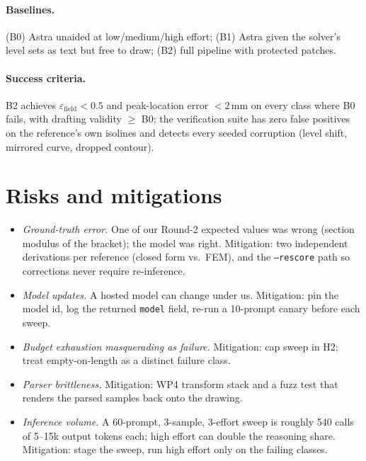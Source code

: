 \documentclass[11pt,a4paper]{article}
\newcommand{\eps}{\varepsilon_{\mathrm{field}}}
\begin{document}
\paragraph{Baselines.} (B0) Astra unaided at low/medium/high effort; (B1) Astra given the solver's level sets as text but free to draw; (B2) full pipeline with protected patches.
\paragraph{Success criteria.} B2 achieves $\eps<0.5$ and peak-location error $<2$\,mm on every class where B0 fails, with drafting validity $\ge$ B0; the verification suite has zero false positives on the reference's own isolines and detects every seeded corruption (level shift, mirrored curve, dropped contour).

\section{Risks and mitigations}
\begin{itemize}[leftmargin=2em]
  \item \emph{Ground-truth error.} One of our Round-2 expected values was wrong (section modulus of the bracket); the model was right. Mitigation: two independent derivations per reference (closed form vs.\ FEM), and the \texttt{--rescore} path so corrections never require re-inference.
  \item \emph{Model updates.} A hosted model can change under us. Mitigation: pin the model id, log the returned \texttt{model} field, re-run a 10-prompt canary before each sweep.
  \item \emph{Budget exhaustion masquerading as failure.} Mitigation: cap sweep in H2; treat empty-on-length as a distinct failure class.
  \item \emph{Parser brittleness.} Mitigation: WP4 transform stack and a fuzz test that renders the parsed samples back onto the drawing.
  \item \emph{Inference volume.} A 60-prompt, 3-sample, 3-effort sweep is roughly 540 calls of 5--15k output tokens each; high effort can double the reasoning share. Mitigation: stage the sweep, run high effort only on the failing classes.
\end{itemize}
\end{document}
